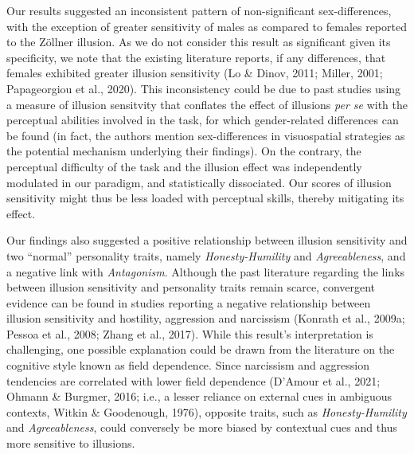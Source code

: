 \documentclass[
  man,floatsintext]{apa6}
\begin{document}
Our results suggested an inconsistent pattern of non-significant sex-differences, with the exception of greater sensitivity of males as compared to females reported to the Zöllner illusion. As we do not consider this result as significant given its specificity, we note that the existing literature reports, if any differences, that females exhibited greater illusion sensitivity (Lo \& Dinov, 2011; Miller, 2001; Papageorgiou et al., 2020). This inconsistency could be due to past studies using a measure of illusion sensitvity that conflates the effect of illusions \emph{per se} with the perceptual abilities involved in the task, for which gender-related differences can be found (in fact, the authors mention sex-differences in visuospatial strategies as the potential mechanism underlying their findings). On the contrary, the perceptual difficulty of the task and the illusion effect was independently modulated in our paradigm, and statistically dissociated. Our scores of illusion sensitivity might thus be less loaded with perceptual skills, thereby mitigating its effect.

Our findings also suggested a positive relationship between illusion sensitivity and two ``normal'' personality traits, namely \emph{Honesty-Humility} and \emph{Agreeableness}, and a negative link with \emph{Antagonism}. Although the past literature regarding the links between illusion sensitivity and personality traits remain scarce, convergent evidence can be found in studies reporting a negative relationship between illusion sensitivity and hostility, aggression and narcissism (Konrath et al., 2009a; Pessoa et al., 2008; Zhang et al., 2017). While this result's interpretation is challenging, one possible explanation could be drawn from the literature on the cognitive style known as field dependence. Since narcissism and aggression tendencies are correlated with lower field dependence (D'Amour et al., 2021; Ohmann \& Burgmer, 2016; i.e., a lesser reliance on external cues in ambiguous contexts, Witkin \& Goodenough, 1976), opposite traits, such as \emph{Honesty-Humility} and \emph{Agreeableness}, could conversely be more biased by contextual cues and thus more sensitive to illusions.
\end{document}
